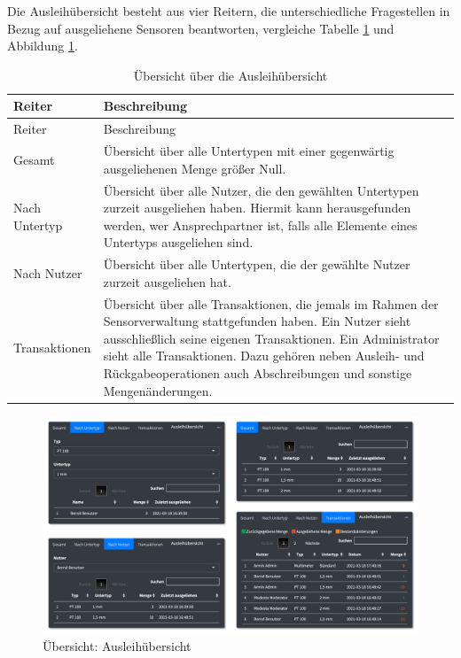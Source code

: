 \documentclass[
]{article}
\begin{document}
Die Ausleihübersicht besteht aus vier Reitern, die unterschiedliche Fragestellen in Bezug auf ausgeliehene Sensoren beantworten, vergleiche Tabelle \ref{tab:reporting-details} und Abbildung \ref{fig:reporting-details}.

\begin{longtable}[]{@{}
  >{\raggedright\arraybackslash}p{}
  >{\raggedright\arraybackslash}p{}@{}}
\caption{\label{tab:reporting-details} Übersicht über die Ausleihübersicht}\tabularnewline
\toprule
Reiter & Beschreibung \\
\midrule
\endfirsthead
\toprule
Reiter & Beschreibung \\
\midrule
\endhead
Gesamt & Übersicht über alle Untertypen mit einer gegenwärtig ausgeliehenen Menge größer Null. \\
Nach Untertyp & Übersicht über alle Nutzer, die den gewählten Untertypen zurzeit ausgeliehen haben. Hiermit kann herausgefunden werden, wer Ansprechpartner ist, falls alle Elemente eines Untertyps ausgeliehen sind. \\
Nach Nutzer & Übersicht über alle Untertypen, die der gewählte Nutzer zurzeit ausgeliehen hat. \\
Transaktionen & Übersicht über alle Transaktionen, die jemals im Rahmen der Sensorverwaltung stattgefunden haben. Ein Nutzer sieht ausschließlich seine eigenen Transaktionen. Ein Administrator sieht alle Transaktionen. Dazu gehören neben Ausleih- und Rückgabeoperationen auch Abschreibungen und sonstige Mengenänderungen. \\
\bottomrule
\end{longtable}

\begin{figure}
\centering
\includegraphics{./img/reporting_details.png}
\caption{\label{fig:reporting-details}Übersicht: Ausleihübersicht}
\end{figure}
\end{document}
